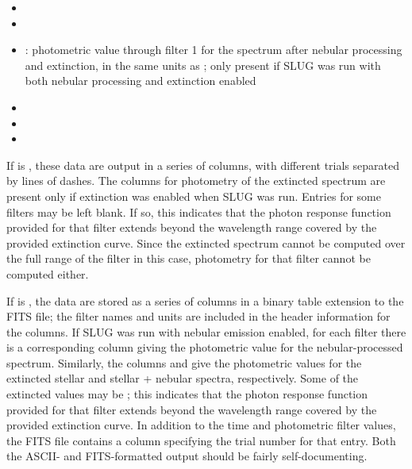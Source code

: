\documentclass[letterpaper,10pt,english]{sphinxmanual}
\begin{document}
\begin{itemize}
\item {} 

\item {} 

\item {} 
: photometric value through filter 1 for the spectrum after nebular processing and extinction, in the same units as ; only present if SLUG was run with both nebular processing and extinction enabled

\item {} 

\item {} 

\item {} 

\end{itemize}

If  is , these data are output in a series of
columns, with different trials separated by lines of dashes. The
columns for photometry of the extincted spectrum are present only if
extinction was enabled when SLUG was run. Entries for some filters may
be left blank. If so, this indicates that the photon response function
provided for that filter extends beyond the wavelength range covered
by the provided extinction curve. Since the extincted spectrum cannot
be computed over the full range of the filter in this case, photometry
for that filter cannot be computed either.

If  is , the data are stored as a series of
columns in a binary table extension to the FITS file; the filter names
and units are included in the header information for the columns. If
SLUG was run with nebular emission enabled, for each filter 
there is a corresponding column  giving the photometric
value for the nebular-processed spectrum. Similarly, the columns
 and  give the photometric values
for the extincted stellar and stellar + nebular spectra, respectively.
Some of the extincted values may be ; this
indicates that the photon response function provided for that filter
extends beyond the wavelength range covered by the provided extinction
curve. In addition to the time and photometric filter values, the FITS
file contains a column specifying the trial number for that
entry. Both the ASCII- and FITS-formatted output should be fairly
self-documenting.
\end{document}
